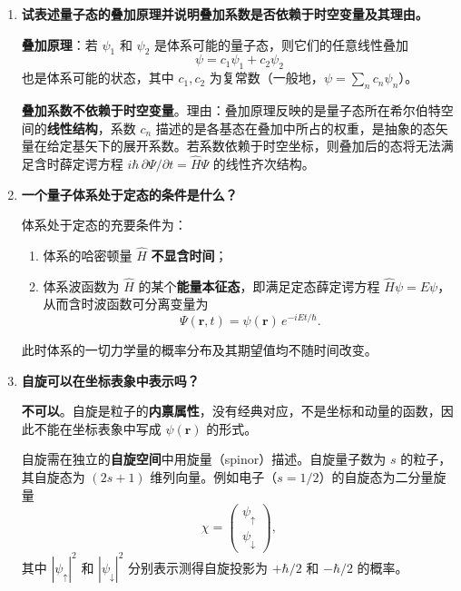 \begin{enumerate}[label=\textbf{\arabic*.}, leftmargin=2em, itemsep=0.8em]

\item \textbf{试表述量子态的叠加原理并说明叠加系数是否依赖于时空变量及其理由。}

\textbf{叠加原理}：若 $\psi_1$ 和 $\psi_2$ 是体系可能的量子态，则它们的任意线性叠加
\[
    \psi = c_1\psi_1 + c_2\psi_2
\]
也是体系可能的状态，其中 $c_1, c_2$ 为复常数（一般地，$\psi = \sum_n c_n\psi_n$）。

\textbf{叠加系数不依赖于时空变量}。理由：叠加原理反映的是量子态所在希尔伯特空间的\textbf{线性结构}，系数 $c_n$ 描述的是各基态在叠加中所占的权重，是抽象的态矢量在给定基矢下的展开系数。若系数依赖于时空坐标，则叠加后的态将无法满足含时薛定谔方程 $i\hbar\,\partial\Psi/\partial t = \hat{H}\Psi$ 的线性齐次结构。

\item \textbf{一个量子体系处于定态的条件是什么？}

体系处于定态的充要条件为：
\begin{enumerate}[nosep, label=(\arabic*)]
    \item 体系的哈密顿量 $\hat{H}$ \textbf{不显含时间}；
    \item 体系波函数为 $\hat{H}$ 的某个\textbf{能量本征态}，即满足定态薛定谔方程 $\hat{H}\psi = E\psi$，从而含时波函数可分离变量为
    \[
        \Psi(\mathbf{r},t) = \psi(\mathbf{r})\,e^{-iEt/\hbar}.
    \]
\end{enumerate}
此时体系的一切力学量的概率分布及其期望值均不随时间改变。

\item \textbf{自旋可以在坐标表象中表示吗？}

\textbf{不可以}。自旋是粒子的\textbf{内禀属性}，没有经典对应，不是坐标和动量的函数，因此不能在坐标表象中写成 $\psi(\mathbf{r})$ 的形式。

自旋需在独立的\textbf{自旋空间}中用旋量（spinor）描述。自旋量子数为 $s$ 的粒子，其自旋态为 $(2s+1)$ 维列向量。例如电子（$s=1/2$）的自旋态为二分量旋量
\[
    \chi = \begin{pmatrix} \psi_\uparrow \\ \psi_\downarrow \end{pmatrix},
\]
其中 $|\psi_\uparrow|^2$ 和 $|\psi_\downarrow|^2$ 分别表示测得自旋投影为 $+\hbar/2$ 和 $-\hbar/2$ 的概率。


\end{enumerate}
